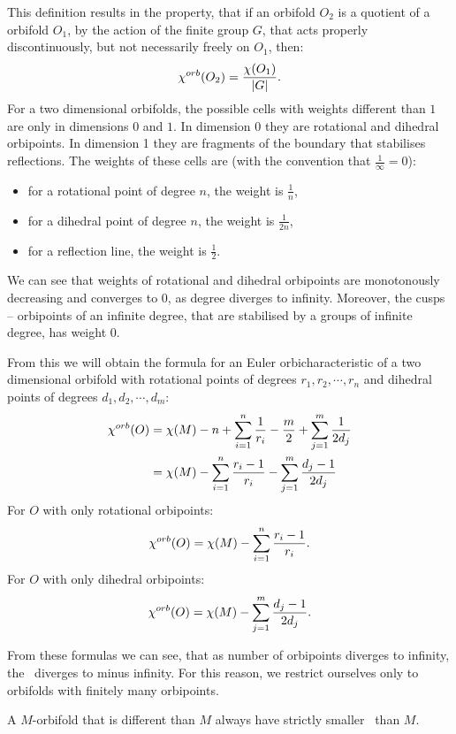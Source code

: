 This definition results in the property, that if an orbifold $O_2$ is a quotient 
of a orbifold $O_1$, by the action of the finite group $G$, that acts properly 
discontinuously, but not necessarily freely on $O_1$, then:
\begin{equation}
{\chi^{orb}(O_2)} = \frac{\chi(O_1)}{|G|}.
\end{equation}
For a two dimensional orbifolds, the possible cells with weights different than $1$ are 
only in dimensions $0$ and $1$. In dimension 0 they are rotational and dihedral 
orbipoints. In dimension 1 they are fragments of the boundary that stabilises reflections. 
The weights of these cells are (with the convention that $\frac{1}{\infty} = 0$):
\begin{itemize}
\item for a rotational point of degree $n$, the weight is $\frac{1}{n}$,
\item for a dihedral point of degree $n$, the weight is $\frac{1}{2n}$,
\item for a reflection line, the weight is $\frac{1}{2}$.
\end{itemize}
We can see that weights of rotational and dihedral orbipoints are monotonously decreasing 
and converges to $0$, as degree diverges to infinity. Moreover, the 
cusps -- orbipoints of an infinite degree, 
that are stabilised by a groups of infinite degree, has weight $0$.

From this we will obtain the formula for an Euler orbicharacteristic of a two dimensional 
orbifold with rotational points of degrees $r_1, r_2, \cdots, r_n$ and dihedral points 
of degrees $d_1, d_2, \cdots, d_m$:
\begin{align}\label{chi orb expression}
{\chi^{orb}(O)} &= \chi (M) - n + \sum_{i=1}^n \frac{1}{r_i} - \frac{m}{2} + \sum_{j=1}^m \frac{1}{2d_j} \\
&= \chi (M) - \sum_{i=1}^n \frac{r_i-1}{r_i} - \sum_{j=1}^m \frac{d_j-1}{2d_j}
\end{align}
For $O$ with only rotational orbipoints:
\begin{equation}\label{chi orb expression rotational}
{\chi^{orb}(O)} = \chi (M) - \sum_{i=1}^n \frac{r_i-1}{r_i}.
\end{equation}
For $O$ with only dihedral orbipoints:
\begin{equation}\label{chi orb expression dihedral}
{\chi^{orb}(O)} = \chi (M) - \sum_{j=1}^m \frac{d_j-1}{2d_j}.
\end{equation}

From these formulas we can see, that as number of orbipoints diverges to infinity, the \Eoc\ 
diverges to minus infinity. For this reason, we restrict ourselves only to orbifolds 
with finitely many orbipoints.
\begin{observation}\label{orbifolds have smaller Eoc than their base manifolds}
A $M$-orbifold that is different than $M$ always have strictly smaller \Eoc\ than $M$. 
\end{observation}

